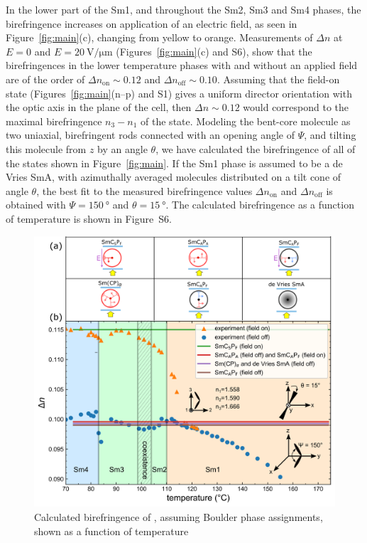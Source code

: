\documentclass[aagreenthesis]{subfiles}
\begin{document}
In the lower part of the Sm1, and throughout the Sm2, Sm3 and Sm4 phases, the birefringence increases on application of an electric field, as seen in Figure~\ref{fig:main}(c),  changing from yellow to orange.
Measurements of $\Delta n$ at $E = 0$ and $E = \SI{20}{\volt\per\micro\metre}$
(Figures~\ref{fig:main}(c) and S6),
show that the birefringences in the lower temperature
phases with and without an applied field are of the order of $\Delta n_\text{on} \sim 0.12$ and $\Delta n_\text{off} \sim 0.10$.
Assuming that the field-on  state
(Figures~\ref{fig:main}(n--p) and S1) gives a uniform
director orientation with the optic axis in the plane of the cell, then $\Delta
n \sim 0.12$ would correspond to the maximal birefringence $n_3-n_1$ of the
 state. Modeling the bent-core molecule
as two uniaxial, birefringent rods connected with an opening angle of
$\Psi$, and tilting this molecule from $z$ by an angle $\theta$,
we have calculated the birefringence of all of the states shown in
Figure~\ref{fig:main}. If the Sm1 phase is assumed to be a de Vries SmA, with
azimuthally averaged molecules distributed on a tilt cone of angle
$\theta$, the best fit to the measured birefringence values $\Delta n_\text{on}$ and $\Delta n_\text{off}$ is
obtained with $\Psi = \SI{150}{\degree}$ and $\theta = \SI{15}{\degree}$.
The calculated birefringence as a function of temperature is shown in Figure~S6.
\begin{figure}[h!]
    \centering
    \includegraphics[width=.8\textwidth]{figs/pal30/fromPaper/finalFigs/theory-biref.png}
    \caption{\label{fig:pal30:theorybiref} Calculated birefringence of \nfour{},
        assuming Boulder phase assignments,
    shown as a function of temperature}
\end{figure}
\end{document}
